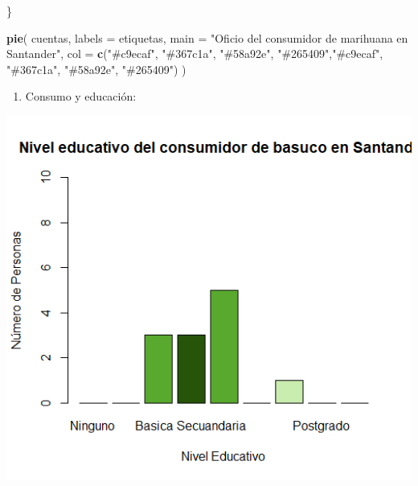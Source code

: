 \documentclass[
]{article}
\newenvironment{Shaded}{\begin{snugshade}}{\end{snugshade}}
\newcommand{\AttributeTok}[1]{\textcolor[rgb]{0.13,0.29,0.53}{#1}}
\newcommand{\FunctionTok}[1]{\textcolor[rgb]{0.13,0.29,0.53}{\textbf{#1}}}
\newcommand{\NormalTok}[1]{#1}
\newcommand{\StringTok}[1]{\textcolor[rgb]{0.31,0.60,0.02}{#1}}
\providecommand{\tightlist}{%
  \setlength{\itemsep}{0pt}\setlength{\parskip}{0pt}}
\begin{document}
\begin{Shaded}
\begin{Highlighting}[]
\NormalTok{\}}

\FunctionTok{pie}\NormalTok{(}
\NormalTok{  cuentas,}
  \AttributeTok{labels =}\NormalTok{ etiquetas,}
  \AttributeTok{main =} \StringTok{"Oficio del consumidor de marihuana en Santander"}\NormalTok{,}
  \AttributeTok{col =} \FunctionTok{c}\NormalTok{(}\StringTok{"\#c9ecaf"}\NormalTok{, }\StringTok{"\#367c1a"}\NormalTok{, }\StringTok{"\#58a92e"}\NormalTok{, }\StringTok{"\#265409"}\NormalTok{,}\StringTok{"\#c9ecaf"}\NormalTok{, }\StringTok{"\#367c1a"}\NormalTok{, }\StringTok{"\#58a92e"}\NormalTok{, }\StringTok{"\#265409"}\NormalTok{)}
\NormalTok{)}
\end{Highlighting}
\end{Shaded}

\begin{enumerate}
\def\labelenumi{\arabic{enumi}.}
\setcounter{enumi}{2}
\tightlist
\item
  Consumo y educación:
\end{enumerate}

\includegraphics{images/basuco educacion santander.png}
\end{document}
